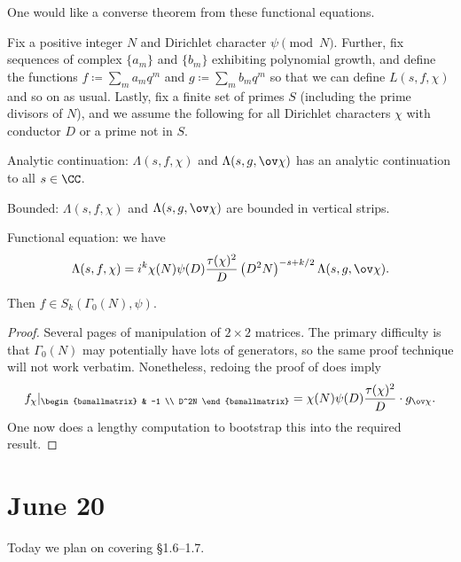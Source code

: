 \documentclass{article}
\begin{document}
One would like a converse theorem from these functional equations.
\begin{theorem}[Weil]
	Fix a positive integer $N$ and Dirichlet character $\psi\pmod N$. Further, fix sequences of complex $\{a_m\}$ and $\{b_m\}$ exhibiting polynomial growth, and define the functions $f\coloneqq\sum_{m}a_mq^m$ and $g\coloneqq\sum_mb_mq^m$ so that we can define $L(s,f,\chi)$ and so on as usual. Lastly, fix a finite set of primes $S$ (including the prime divisors of $N$), and we assume the following for all Dirichlet characters $\chi$ with conductor $D$ or a prime not in $S$.
	\begin{listalph}
		\item Analytic continuation: $\Lambda(s,f,\chi)$ and $\Lambda(s,g,\ov\chi)$ has an analytic continuation to all $s\in\CC$.
		\item Bounded: $\Lambda(s,f,\chi)$ and $\Lambda(s,g,\ov\chi)$ are bounded in vertical strips.
		\item Functional equation: we have
		\[\Lambda(s,f,\chi)=i^k\chi(N)\psi(D)\frac{\tau(\chi)^2}D\left(D^2N\right)^{-s+k/2}\Lambda(s,g,\ov\chi).\]
	\end{listalph}
	Then $f\in S_k(\Gamma_0(N),\psi)$.
\end{theorem}
\begin{proof}
	Several pages of manipulation of $2\times2$ matrices. The primary difficulty is that $\Gamma_0(N)$ may potentially have lots of generators, so the same proof technique will not work verbatim. Nonetheless, redoing the proof of  does imply
	\[f_\chi|_{\begin{bsmallmatrix}
		& -1 \\ D^2N
	\end{bsmallmatrix}}=\chi(N)\psi(D)\frac{\tau(\chi)^2}D\cdot g_{\ov\chi}.\]
	One now does a lengthy computation to bootstrap this into the required result.
\end{proof}

\section{June 20}
Today we plan on covering \S1.6--1.7.
\end{document}
